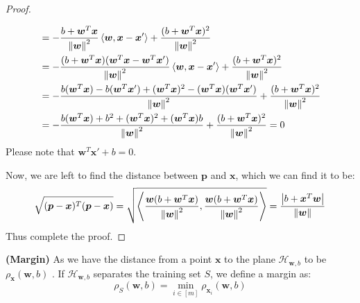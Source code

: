 \begin{proof}
\begin{itemize}
\begin{equation*}
\begin{aligned}
        &= -\frac{b + \boldsymbol w^T\boldsymbol x}{\left\lVert\boldsymbol w\right\rVert^2}\left\langle \boldsymbol w, \boldsymbol x - \boldsymbol x' \right\rangle + \frac{(b + \boldsymbol w^T\boldsymbol x)^2}{\left\lVert\boldsymbol w\right\rVert^2} \\
        &= -\frac{(b + \boldsymbol w^T\boldsymbol x)(\boldsymbol w^T\boldsymbol x - \boldsymbol w^T\boldsymbol x')}{\left\lVert\boldsymbol w\right\rVert^2}\left\langle \boldsymbol w, \boldsymbol x - \boldsymbol x' \right\rangle + \frac{(b + \boldsymbol w^T\boldsymbol x)^2}{\left\lVert\boldsymbol w\right\rVert^2} \\
        &= -\frac{b(\boldsymbol w^T\boldsymbol x) - b(\boldsymbol w^T\boldsymbol x') + (\boldsymbol w^T\boldsymbol x)^2 - (\boldsymbol w^T\boldsymbol x)(\boldsymbol w^T\boldsymbol x')}{\left\lVert\boldsymbol w\right\rVert^2} + \frac{(b + \boldsymbol w^T\boldsymbol x)^2}{\left\lVert\boldsymbol w\right\rVert^2} \\
        &= -\frac{b(\boldsymbol w^T\boldsymbol x) + b^2 + (\boldsymbol w^T\boldsymbol x)^2 + (\boldsymbol w^T\boldsymbol x)b}{\left\lVert\boldsymbol w\right\rVert^2} + \frac{(b + \boldsymbol w^T\boldsymbol x)^2}{\left\lVert\boldsymbol w\right\rVert^2} =0 \\
        \end{aligned}
        \end{equation*}
        Please note that $\boldsymbol w^T\boldsymbol x' + b = 0$.
    \end{itemize}
    Now, we are left to find the distance between $\boldsymbol p$ and $\boldsymbol x$, which we can find it to be:
    \begin{equation*}
        \sqrt{(\boldsymbol p - \boldsymbol x)^T(\boldsymbol p - \boldsymbol x)} = \sqrt{\left\langle \frac{\boldsymbol w(b + \boldsymbol w^T\boldsymbol x)}{\left\lVert\boldsymbol w\right\rVert^2}, \frac{\boldsymbol w(b + \boldsymbol w^T\boldsymbol x)}{\left\lVert\boldsymbol w\right\rVert^2} \right\rangle} = \frac{\left| b + \boldsymbol x^T\boldsymbol w \right|}{\left\lVert\boldsymbol w\right\rVert}
    \end{equation*}
    Thus complete the proof.
\end{proof}

\begin{definition}{\textbf{(Margin)}}
    As we have the distance from a point $\boldsymbol x$ to the plane $\mathcal{H}_{\boldsymbol w, b}$ to be $\rho_{\boldsymbol x}(\boldsymbol w, b)$ . If $\mathcal{H}_{\boldsymbol w, b}$ separates the training set $S$, we define a margin as:
    \begin{equation*}
        \rho_S(\boldsymbol w, b ) = \min_{i \in [m]}\rho_{\boldsymbol x_i}(\boldsymbol w, b)
    \end{equation*}
\end{definition}


